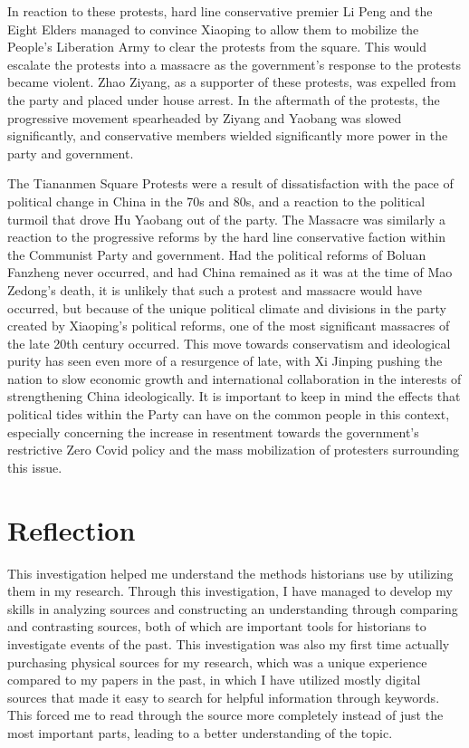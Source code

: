 \documentclass{paper}
\begin{document}
In reaction to these protests, hard line conservative premier Li Peng and the Eight Elders managed to convince Xiaoping to allow them to mobilize the People's Liberation Army to clear the protests from the square.
This would escalate the protests into a massacre as the government's response to the protests became violent.
Zhao Ziyang, as a supporter of these protests, was expelled from the party and placed under house arrest.\autocite{tiananmen}
In the aftermath of the protests, the progressive movement spearheaded by Ziyang and Yaobang was slowed significantly, and conservative members wielded significantly more power in the party and government.

The Tiananmen Square Protests were a result of dissatisfaction with the pace of political change in China in the 70s and 80s, and a reaction to the political turmoil that drove Hu Yaobang out of the party.
The Massacre was similarly a reaction to the progressive reforms by the hard line conservative faction within the Communist Party and government.
Had the political reforms of Boluan Fanzheng never occurred, and had China remained as it was at the time of Mao Zedong's death, it is unlikely that such a protest and massacre would have occurred, but because of the unique political climate and divisions in the party created by Xiaoping's political reforms, one of the most significant massacres of the late 20th century occurred.
This move towards conservatism and ideological purity has seen even more of a resurgence of late, with Xi Jinping pushing the nation to slow economic growth and international collaboration in the interests of strengthening China ideologically.
It is important to keep in mind the effects that political tides within the Party can have on the common people in this context, especially concerning the increase in resentment towards the government's restrictive Zero Covid policy and the mass mobilization of protesters surrounding this issue.
%
\newpage
%
\section{Reflection}
This investigation helped me understand the methods historians use by utilizing them in my research.
Through this investigation, I have managed to develop my skills in analyzing sources and constructing an understanding through comparing and contrasting sources, both of which are important tools for historians to investigate events of the past.
This investigation was also my first time actually purchasing physical sources for my research, which was a unique experience compared to my papers in the past, in which I have utilized mostly digital sources that made it easy to search for helpful information through keywords.
This forced me to read through the source more completely instead of just the most important parts, leading to a better understanding of the topic.
\end{document}
